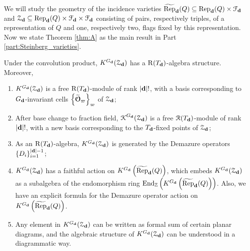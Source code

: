 We will study the geometry of the incidence varieties $\operatorname{\widetilde{\operatorname{Rep}}}_{\mathbf{d}}(Q) \subseteq \operatorname{\operatorname{Rep}}_{\mathbf{d}}(Q) \times \mathcal{F}_{\mathbf{d}}$ and $\operatorname{\mathcal{Z}}_{\mathbf{d}} \subseteq \operatorname{\operatorname{Rep}}_{\mathbf{d}}(Q) \times \mathcal{F}_{\mathbf{d}} \times \mathcal{F}_{\mathbf{d}}$ consisting of pairs, respectively triples, of a representation of $Q$ and one, respectively two, flags fixed by this representation. Now we state Theorem \ref{thm:A} as the main result in Part \ref{part:Steinberg_varieties}.

\begin{theoremA}\label{thm:A}
Under the convolution product, $K^{G_{\mathbf{d}}}(\operatorname{\mathcal{Z}}_{\mathbf{d}})$ has a $\operatorname{\operatorname{R}}(T_{\mathbf{d}})$-algebra structure. Moreover,
\begingroup
\upshape
{}
\renewcommand\labelenumi{(\theenumi)}
\begin{enumerate}
\item $K^{G_{\mathbf{d}}}(\operatorname{\mathcal{Z}}_{\mathbf{d}})$ is a free $\operatorname{\operatorname{R}}(T_{\mathbf{d}})$-module of rank $|\mathbf{d}|!$, with a basis corresponding to $G_{\mathbf{d}}$-invariant cells $\left\{ \widetilde{\boldsymbol{\mathcal{O}}}_{\varpi} \right\}_{\varpi}$ of $\operatorname{\mathcal{Z}}_{\mathbf{d}}$;\label{item:A1}
\item After base change to fraction field, $\operatorname{\operatorname{\mathcal{K}}}^{G_{\mathbf{d}}}(\operatorname{\mathcal{Z}}_{\mathbf{d}})$ is a free $\operatorname{\operatorname{\mathcal{R}}}(T_{\mathbf{d}})$-module of rank $|\mathbf{d}|!$, with a new basis corresponding to the $T_{\mathbf{d}}$-fixed points of $\operatorname{\mathcal{Z}}_{\mathbf{d}}$;\label{item:A2}
\item As an $\operatorname{\operatorname{R}}(T_{\mathbf{d}})$-algebra, $K^{G_{\mathbf{d}}}(\operatorname{\mathcal{Z}}_{\mathbf{d}})$ is generated by the Demazure operators $\{D_i\}_{i=1}^{|\mathbf{d}|-1}$;\label{item:A3}
\item $K^{G_{\mathbf{d}}}(\operatorname{\mathcal{Z}}_{\mathbf{d}})$ has a faithful action on $K^{G_{\mathbf{d}}}\left(\operatorname{\widetilde{\operatorname{Rep}}}_{\mathbf{d}}(Q)\right)$, which embeds $K^{G_{\mathbf{d}}}(\operatorname{\mathcal{Z}}_{\mathbf{d}})$ as a subalgebra of the endomorphism ring $\operatorname{\operatorname{End}}_{\mathbb{Z}}\label{item:A4} \left(K^{G_{\mathbf{d}}}\left(\operatorname{\widetilde{\operatorname{Rep}}}_{\mathbf{d}}(Q)\right)\right)$. Also, we have an explicit formula for the Demazure operator action on $K^{G_{\mathbf{d}}}\left(\operatorname{\widetilde{\operatorname{Rep}}}_{\mathbf{d}}(Q)\right)$.
\item Any element in $K^{G_{\mathbf{d}}}(\operatorname{\mathcal{Z}}_{\mathbf{d}})$ can be written as formal sum of certain planar diagrams, and the algebraic structure of $K^{G_{\mathbf{d}}}(\operatorname{\mathcal{Z}}_{\mathbf{d}})$ can be understood in a diagrammatic way.\label{item:A5}
\end{enumerate} 
\endgroup
\end{theoremA}


